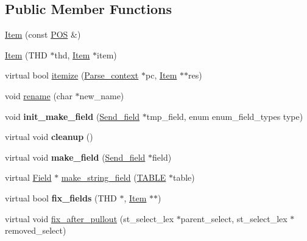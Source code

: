 \subsection*{Public Member Functions}
\begin{DoxyCompactItemize}
\item 
\mbox{\hyperlink{classItem_a9382072b90618574708c944b4f797eb3}{Item}} (const \mbox{\hyperlink{structYYLTYPE}{P\+OS}} \&)
\item 
\mbox{\hyperlink{classItem_ada77f843f657d3acbecf5f9fad69b440}{Item}} (T\+HD $\ast$thd, \mbox{\hyperlink{classItem}{Item}} $\ast$item)
\item 
virtual bool \mbox{\hyperlink{classItem_a0757839d09aa77bfd92bfe071f257ae9}{itemize}} (\mbox{\hyperlink{structParse__context}{Parse\+\_\+context}} $\ast$pc, \mbox{\hyperlink{classItem}{Item}} $\ast$$\ast$res)
\item 
void \mbox{\hyperlink{classItem_aed7a36014781d07bf5470d1f8652c8f2}{rename}} (char $\ast$new\+\_\+name)
\item 
\mbox{\label{classItem_a215d34e08b073eb9e4c02e960c59b7b0}} 
void {\bfseries init\+\_\+make\+\_\+field} (\mbox{\hyperlink{classSend__field}{Send\+\_\+field}} $\ast$tmp\+\_\+field, enum enum\+\_\+field\+\_\+types type)
\item 
\mbox{\label{classItem_a8b47634a02e8a5dbd71902df10a0b1ac}} 
virtual void {\bfseries cleanup} ()
\item 
\mbox{\label{classItem_ab2f65c8bd44c7ff59c27bc962d80c1b5}} 
virtual void {\bfseries make\+\_\+field} (\mbox{\hyperlink{classSend__field}{Send\+\_\+field}} $\ast$field)
\item 
virtual \mbox{\hyperlink{classField}{Field}} $\ast$ \mbox{\hyperlink{classItem_a4380479e68d46a2d719e4a0f5c2ee25e}{make\+\_\+string\+\_\+field}} (\mbox{\hyperlink{structTABLE}{T\+A\+B\+LE}} $\ast$table)
\item 
\mbox{\label{classItem_a618641ca5e51b50d18d7c78dfbc31529}} 
virtual bool {\bfseries fix\+\_\+fields} (T\+HD $\ast$, \mbox{\hyperlink{classItem}{Item}} $\ast$$\ast$)
\item 
virtual void \mbox{\hyperlink{classItem_a6e3c38497d210357a4f80a755fb7b61e}{fix\+\_\+after\+\_\+pullout}} (st\+\_\+select\+\_\+lex $\ast$parent\+\_\+select, st\+\_\+select\+\_\+lex $\ast$removed\+\_\+select)
\item 

\end{DoxyCompactItemize}
